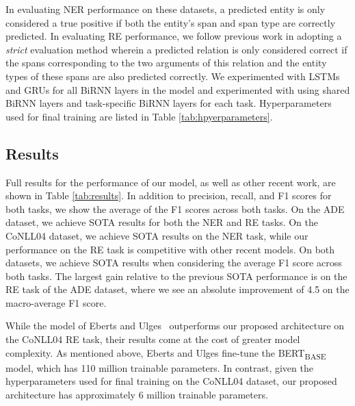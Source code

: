 \documentclass{article}
\begin{document}
\vspace{7pt}

In evaluating NER performance on these datasets, a predicted entity is only considered a true positive if both the entity's span and span type are correctly predicted. In evaluating RE performance, we follow previous work in adopting a {\em strict} evaluation method wherein a predicted relation is only considered correct if the spans corresponding to the two arguments of this relation and the entity types of these spans are also predicted correctly. We experimented with LSTMs and GRUs for all BiRNN layers in the model and experimented with using  shared BiRNN layers and  task-specific BiRNN layers for each task. Hyperparameters used for final training are listed in Table \ref{tab:hpyerparameters}.



\subsection{Results}

Full results for the performance of our model, as well as other recent work, are shown in Table \ref{tab:results}. In addition to precision, recall, and F1 scores for both tasks, we show the average of the F1 scores across both tasks. On the ADE dataset, we achieve SOTA results for both the NER and RE tasks. On the CoNLL04 dataset, we achieve SOTA results on the NER task, while our performance on the RE task is competitive with other recent models. On both datasets, we achieve SOTA results when considering the average F1 score across both tasks. The largest gain relative to the previous SOTA performance is on the RE task of the ADE dataset, where we see an absolute improvement of 4.5 on the macro-average F1 score.

While the model of Eberts and Ulges~ outperforms our proposed architecture on the CoNLL04 RE task, their results come at the cost of greater model complexity. As mentioned above, Eberts and Ulges fine-tune the BERT\textsubscript{BASE} model, which has 110 million trainable parameters. In contrast, given the hyperparameters used for final training on the CoNLL04 dataset, our proposed architecture has approximately 6 million trainable parameters.
\end{document}
